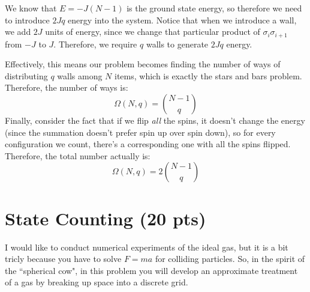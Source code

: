 \documentclass[10pt]{article}
\begin{document}
\begin{enumerate}[label=\alph*)]
			\begin{solution}
				We know that $E = -J(N - 1)$ is the ground state energy, so therefore we need to introduce 
				$2Jq$ energy into the system. Notice that when we introduce a wall, we add $2J$ units of 
				energy, since we change that particular product of $\sigma_i \sigma_{i+1}$ from $-J$ to 
				$J$. Therefore, 
				we require $q$ walls to generate $2Jq$ energy. 

				Effectively, this means our problem becomes finding the number of ways of distributing $q$ walls among $N$
				items, which is exactly the stars and bars problem. Therefore, the number of ways is:
				\[
					\Omega(N, q) = {N - 1 \choose q}
				\] 
				Finally, consider the fact that if we flip \textit{all} the spins, it doesn't change the 
				energy (since the summation doesn't prefer spin up over spin down), so for every configuration
				we count, there's a corresponding one with all the spins flipped. Therefore, the total 
				number actually is:
				\[
					\Omega(N, q) = 2{N  - 1 \choose q}
				\] 
			\end{solution}
	\end{enumerate}

	\pagebreak
	\section*{State Counting (20 pts)}
	I would like to conduct numerical experiments of the ideal gas, but it is a bit tricly because you have 
	to solve $F = ma$ for colliding particles. So, in the spirit of the ``spherical cow", in this problem you 
	will develop an approximate treatment of a gas by breaking up space into a discrete grid. 
\end{document}
